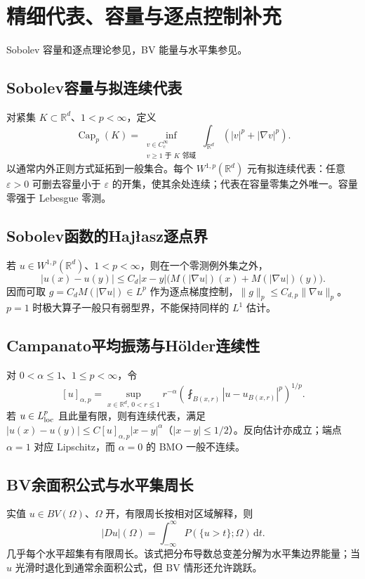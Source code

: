 \documentclass[../main.tex]{subfiles}
\begin{document}
\section{精细代表、容量与逐点控制补充}
Sobolev 容量和逐点理论参见\cite{kinnunen}，BV 能量与水平集参见\cite{variation}。
\subsection{Sobolev容量与拟连续代表}
对紧集 $K\subset\mathbb R^d$、$1<p<\infty$，定义
\[
\operatorname{Cap}_p(K)=\inf_{\substack{v\in C_c^\infty\\v\ge1\text{ 于 }K\text{ 邻域}}}
\int_{\mathbb R^d}(|v|^p+|\nabla v|^p).
\]
以通常内外正则方式延拓到一般集合。每个 $W^{1,p}(\mathbb R^d)$ 元有拟连续代表：任意 $\varepsilon>0$ 可删去容量小于 $\varepsilon$ 的开集，使其余处连续；代表在容量零集之外唯一。容量零强于 Lebesgue 零测。
\subsection{Sobolev函数的Hajłasz逐点界}
若 $u\in W^{1,p}(\mathbb R^d)$、$1<p<\infty$，则在一个零测例外集之外，
\[
|u(x)-u(y)|\le C_d|x-y|
\bigl(M(|\nabla u|)(x)+M(|\nabla u|)(y)\bigr).
\]
因而可取 $g=C_dM(|\nabla u|)\in L^p$ 作为逐点梯度控制，$\|g\|_p\le C_{d,p}\|\nabla u\|_p$。$p=1$ 时极大算子一般只有弱型界，不能保持同样的 $L^1$ 估计。
\subsection{Campanato平均振荡与Hölder连续性}
对 $0<\alpha\le1$、$1\le p<\infty$，令
\[
[u]_{\alpha,p}=\sup_{x\in\mathbb R^d,\,0<r\le1}
r^{-\alpha}\left(\fint_{B(x,r)}|u-u_{B(x,r)}|^p\right)^{1/p}.
\]
若 $u\in L^p_{\rm loc}$ 且此量有限，则有连续代表，满足 $|u(x)-u(y)|\le C[u]_{\alpha,p}|x-y|^\alpha$（$|x-y|\le1/2$）。反向估计亦成立；端点 $\alpha=1$ 对应 Lipschitz，而 $\alpha=0$ 的 BMO 一般不连续。
\subsection{BV余面积公式与水平集周长}
实值 $u\in BV(\Omega)$、$\Omega$ 开，有限周长按相对区域解释，则
\[
|Du|(\Omega)=\int_{-\infty}^{\infty}
P(\{u>t\};\Omega)\,\mathrm dt.
\]
几乎每个水平超集有有限周长。该式把分布导数总变差分解为水平集边界能量；当 $u$ 光滑时退化到通常余面积公式，但 BV 情形还允许跳跃。
\clearpage
\end{document}
